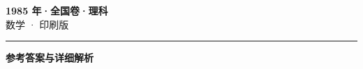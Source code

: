 \documentclass[zihao=5, a4paper]{ctexart}
\begin{document}
\begin{center}
  {\Large\bfseries 1985 年·全国卷·理科}\\[4pt]
  {\large 数学 · 印刷版}
\end{center}
\medskip
{}

\par\bigskip\hrule\bigskip
{}
\begin{center}{\large\bfseries 参考答案与详细解析}\end{center}
\smallskip

\end{document}
